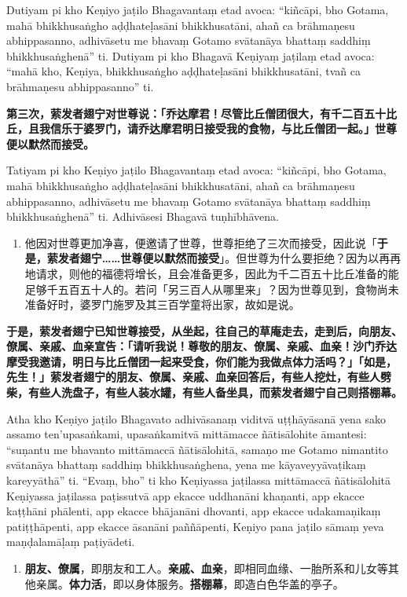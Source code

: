 Dutiyam pi kho Keṇiyo jaṭilo Bhagavantaṃ etad avoca: “kiñcāpi, bho Gotama, mahā bhikkhusaṅgho aḍḍhateḷasāni bhikkhusatāni, ahañ ca brāhmaṇesu abhippasanno, adhivāsetu me bhavaṃ Gotamo svātanāya bhattaṃ saddhiṃ bhikkhusaṅghenā” ti. Dutiyam pi kho Bhagavā Keṇiyaṃ jaṭilaṃ etad avoca: “mahā kho, Keṇiya, bhikkhusaṅgho aḍḍhateḷasāni bhikkhusatāni, tvañ ca brāhmaṇesu abhippasanno” ti.

\textbf{第三次，萦发者翅宁对世尊说：「乔达摩君！尽管比丘僧团很大，有千二百五十比丘，且我信乐于婆罗门，请乔达摩君明日接受我的食物，与比丘僧团一起。」世尊便以默然而接受。}

Tatiyam pi kho Keṇiyo jaṭilo Bhagavantaṃ etad avoca: “kiñcāpi, bho Gotama, mahā bhikkhusaṅgho aḍḍhateḷasāni bhikkhusatāni, ahañ ca brāhmaṇesu abhippasanno, adhivāsetu me bhavaṃ Gotamo svātanāya bhattaṃ saddhiṃ bhikkhusaṅghenā” ti. Adhivāsesi Bhagavā tuṇhībhāvena.

\begin{enumerate}\item 他因对世尊更加净喜，便邀请了世尊，世尊拒绝了三次而接受，因此说「\textbf{于是，萦发者翅宁……世尊便以默然而接受}」。但世尊为什么要拒绝？因为以再再地请求，则他的福德将增长，且会准备更多，因此为千二百五十比丘准备的能足够千五百五十人的。若问「另三百人从哪里来」？因为世尊见到，食物尚未准备好时，婆罗门施罗及其三百学童将出家，故如是说。\end{enumerate}

\textbf{于是，萦发者翅宁已知世尊接受，从坐起，往自己的草庵走去，走到后，向朋友、僚属、亲戚、血亲宣告：「请听我说！尊敬的朋友、僚属、亲戚、血亲！沙门乔达摩受我邀请，明日与比丘僧团一起来受食，你们能为我做点体力活吗？」「如是，先生！」萦发者翅宁的朋友、僚属、亲戚、血亲回答后，有些人挖灶，有些人劈柴，有些人洗盘子，有些人装水罐，有些人备坐具，而萦发者翅宁自己则搭棚幕。}

Atha kho Keṇiyo jaṭilo Bhagavato adhivāsanaṃ viditvā uṭṭhāyāsanā yena sako assamo ten’upasaṅkami, upasaṅkamitvā mittāmacce ñātisālohite āmantesi: “suṇantu me bhavanto mittāmaccā ñātisālohitā, samaṇo me Gotamo nimantito svātanāya bhattaṃ saddhiṃ bhikkhusaṅghena, yena me kāyaveyyāvaṭikaṃ kareyyāthā” ti. “Evaṃ, bho” ti kho Keṇiyassa jaṭilassa mittāmaccā ñātisālohitā Keṇiyassa jaṭilassa paṭissutvā app ekacce uddhanāni khaṇanti, app ekacce kaṭṭhāni phālenti, app ekacce bhājanāni dhovanti, app ekacce udakamaṇikaṃ patiṭṭhāpenti, app ekacce āsanāni paññāpenti, Keṇiyo pana jaṭilo sāmaṃ yeva maṇḍalamāḷaṃ paṭiyādeti.

\begin{enumerate}\item \textbf{朋友、僚属}，即朋友和工人。\textbf{亲戚、血亲}，即相同血缘、一胎所系和儿女等其他亲属。\textbf{体力活}，即以身体服务。\textbf{搭棚幕}，即造白色华盖的亭子。\end{enumerate}

